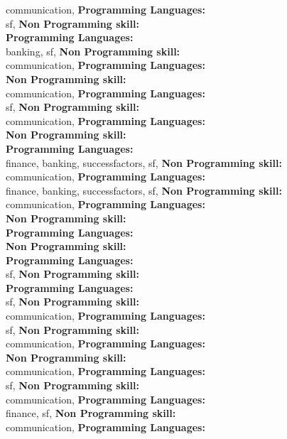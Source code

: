 communication, \textbf{Programming Languages:} \\
sf, \textbf{Non Programming skill:} \\
\textbf{Programming Languages:} \\
banking, sf, \textbf{Non Programming skill:} \\
communication, \textbf{Programming Languages:} \\
\textbf{Non Programming skill:} \\
communication, \textbf{Programming Languages:} \\
sf, \textbf{Non Programming skill:} \\
communication, \textbf{Programming Languages:} \\
\textbf{Non Programming skill:} \\
\textbf{Programming Languages:} \\
finance, banking, successfactors, sf, \textbf{Non Programming skill:} \\
communication, \textbf{Programming Languages:} \\
finance, banking, successfactors, sf, \textbf{Non Programming skill:} \\
communication, \textbf{Programming Languages:} \\
\textbf{Non Programming skill:} \\
\textbf{Programming Languages:} \\
\textbf{Non Programming skill:} \\
\textbf{Programming Languages:} \\
sf, \textbf{Non Programming skill:} \\
\textbf{Programming Languages:} \\
sf, \textbf{Non Programming skill:} \\
communication, \textbf{Programming Languages:} \\
sf, \textbf{Non Programming skill:} \\
communication, \textbf{Programming Languages:} \\
\textbf{Non Programming skill:} \\
communication, \textbf{Programming Languages:} \\
sf, \textbf{Non Programming skill:} \\
communication, \textbf{Programming Languages:} \\
finance, sf, \textbf{Non Programming skill:} \\
communication, \textbf{Programming Languages:} \\
